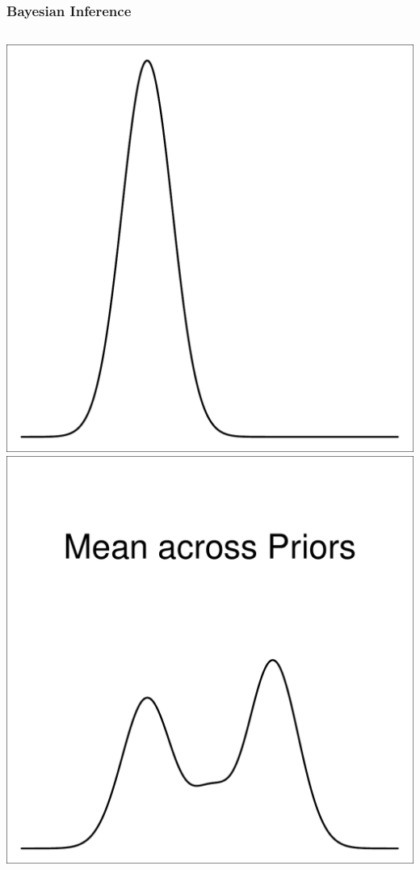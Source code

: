 \documentclass{beamer}
\begin{document}
\begin{frame}[t]
    \frametitle{Bayesian Inference}
    \begin{columns}[c]
            \begin{flushright}
                \includegraphics[width=1\textwidth]{bayesian_update_illustration_th1.pdf}\\
                \includegraphics[width=1\textwidth]{bayesian_update_illustration_prior.pdf}\\

\end{flushright}
\end{columns}
\end{frame}
\end{document}
